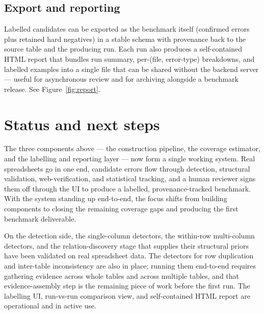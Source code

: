 \documentclass[11pt]{article}
\begin{document}
\subsection*{Export and reporting}
Labelled candidates can be exported as the benchmark itself
(confirmed errors plus retained hard negatives) in a stable
schema with provenance back to the source table and the
producing run. Each run also produces a self-contained HTML
report that bundles run summary, per-(file, error-type)
breakdowns, and labelled examples into a single file that
can be shared without the backend server --- useful for
asynchronous review and for archiving alongside a benchmark
release. See Figure~\ref{fig:report}.

\section*{Status and next steps}
The three components above --- the construction pipeline, the
coverage estimator, and the labelling and reporting layer
--- now form a single working system. Real spreadsheets go
in one end, candidate errors flow through detection,
structural validation, web-verification, and statistical
tracking, and a human reviewer signs them off through the
UI to produce a labelled, provenance-tracked benchmark.
With the system standing up end-to-end, the focus shifts
from building components to closing the remaining coverage
gaps and producing the first benchmark deliverable.

On the detection side, the single-column detectors, the
within-row multi-column detectors, and the relation-discovery
stage that supplies their structural priors have been
validated on real spreadsheet data. The detectors for
row duplication and inter-table inconsistency are also in
place; running them end-to-end requires gathering evidence
across whole tables and across multiple tables, and that
evidence-assembly step is the remaining piece of work
before the first run. The labelling UI,
run-vs-run comparison view, and self-contained HTML report
are operational and in active use.
\end{document}

